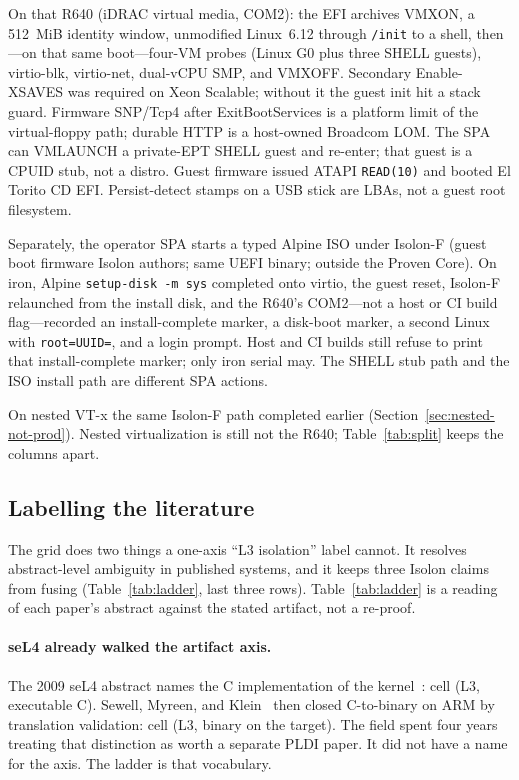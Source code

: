 \documentclass[sigplan,10pt,anonymous]{acmart}
\begin{document}
On that R640 (iDRAC virtual media, COM2): the EFI
archives VMXON, a 512~MiB identity window, unmodified Linux~6.12 through
\texttt{/init} to a shell, then---on that same boot---four-VM probes
(Linux G0 plus three SHELL guests), virtio-blk, virtio-net, dual-vCPU
SMP, and VMXOFF. Secondary Enable-XSAVES was required on Xeon Scalable;
without it the guest init hit a stack guard. Firmware SNP/Tcp4 after
ExitBootServices is a platform limit of the virtual-floppy path; durable
HTTP is a host-owned Broadcom LOM. The SPA can VMLAUNCH a private-EPT SHELL
guest and re-enter; that guest is a CPUID stub, not a distro. Guest firmware
issued ATAPI \texttt{READ(10)} and booted El Torito CD EFI. Persist-detect
stamps on a USB stick are LBAs, not a guest root filesystem.

Separately, the operator SPA starts a typed Alpine ISO under Isolon-F
(guest boot firmware Isolon authors; same UEFI binary; outside the Proven
Core). On iron, Alpine \texttt{setup-disk -m sys} completed onto virtio,
the guest reset, Isolon-F relaunched from the install disk, and the R640's
COM2---not a host or CI build flag---recorded an install-complete marker,
a disk-boot marker, a second Linux with \texttt{root=UUID=}, and a login
prompt. Host and CI builds still refuse to print that install-complete
marker; only iron serial may. The SHELL stub path and the ISO install path
are different SPA actions.

On nested VT-x the same Isolon-F path completed earlier
(Section~\ref{sec:nested-not-prod}). Nested virtualization is still not
the R640; Table~\ref{tab:split} keeps the columns apart.

\subsection{Labelling the literature}
\label{sec:ladder-eval}

The grid does two things a one-axis ``L3 isolation'' label cannot. It
resolves abstract-level ambiguity in published systems, and it keeps three
Isolon claims from fusing (Table~\ref{tab:ladder}, last three rows).
Table~\ref{tab:ladder} is a reading of each paper's abstract against the
stated artifact, not a re-proof.

\paragraph{seL4 already walked the artifact axis.}
The 2009 seL4 abstract names the C implementation of the
kernel~\cite{klein2009sel4}: cell (L3, executable C). Sewell, Myreen, and
Klein~\cite{sewell2013translation} then closed C-to-binary on ARM by
translation validation: cell (L3, binary on the target). The field spent
four years treating that distinction as worth a separate PLDI paper. It
did not have a name for the axis. The ladder is that vocabulary.
\end{document}
